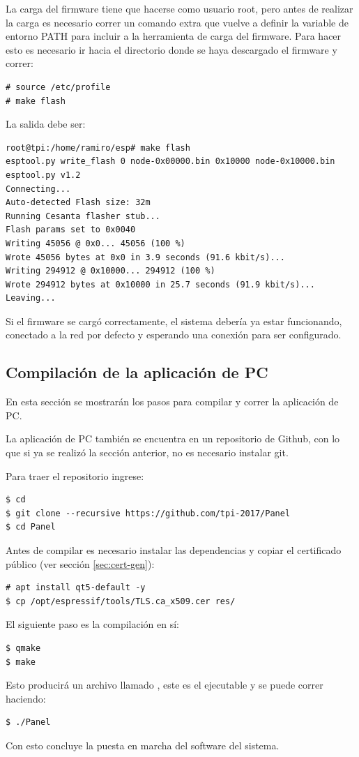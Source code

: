 La carga del firmware tiene que hacerse como usuario root, pero antes de realizar la carga es necesario correr un comando extra que vuelve a definir la variable de entorno PATH para incluir a la herramienta de carga del firmware.
Para hacer esto es necesario ir hacia el directorio donde se haya descargado el firmware y correr:
\begin{lstlisting}
# source /etc/profile
# make flash
\end{lstlisting}

La salida debe ser:
\begin{lstlisting}
root@tpi:/home/ramiro/esp# make flash
esptool.py write_flash 0 node-0x00000.bin 0x10000 node-0x10000.bin
esptool.py v1.2
Connecting...
Auto-detected Flash size: 32m
Running Cesanta flasher stub...
Flash params set to 0x0040
Writing 45056 @ 0x0... 45056 (100 %)
Wrote 45056 bytes at 0x0 in 3.9 seconds (91.6 kbit/s)...
Writing 294912 @ 0x10000... 294912 (100 %)
Wrote 294912 bytes at 0x10000 in 25.7 seconds (91.9 kbit/s)...
Leaving...
\end{lstlisting}

Si el firmware se cargó correctamente, el sistema debería ya estar funcionando, conectado a la red por defecto y esperando una conexión para ser configurado.

\subsection{Compilación de la aplicación de PC}
En esta sección se mostrarán los pasos para compilar y correr la aplicación de PC.

La aplicación de PC también se encuentra en un repositorio de Github, con lo que si ya se realizó la sección anterior, no es necesario instalar git.

Para traer el repositorio ingrese:
\begin{lstlisting}
$ cd
$ git clone --recursive https://github.com/tpi-2017/Panel
$ cd Panel
\end{lstlisting}

Antes de compilar es necesario instalar las dependencias y copiar el certificado público (ver sección \ref{sec:cert-gen}):

\begin{lstlisting}
# apt install qt5-default -y
$ cp /opt/espressif/tools/TLS.ca_x509.cer res/
\end{lstlisting}

El siguiente paso es la compilación en sí:

\begin{lstlisting}
$ qmake
$ make
\end{lstlisting}

Esto producirá un archivo llamado , este es el ejecutable y se puede correr haciendo:

\begin{lstlisting}
$ ./Panel
\end{lstlisting}

Con esto concluye la puesta en marcha del software del sistema.
